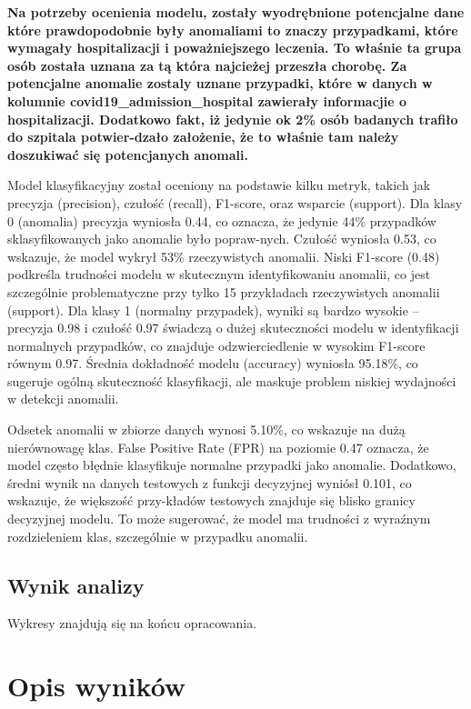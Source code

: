\documentclass[a4paper,fleqn]{cas-dc}
\begin{document}
\textbf{Na potrzeby ocenienia modelu, zostały wyodrębnione potencjalne dane które prawdopodobnie były anomaliami to znaczy przypadkami, które wymagały hospitalizacji i poważniejszego leczenia. To właśnie ta grupa osób została uznana za tą która najcieżej przeszła chorobę. Za potencjalne anomalie zostaly uznane przypadki, które w danych w kolumnie covid19\_admission\_hospital zawierały informacjie o  hospitalizacji. Dodatkowo fakt, iż jedynie ok 2\% osób badanych trafiło do szpitala potwier-dzało założenie, że to właśnie tam należy doszukiwać się potencjanych anomali.}  

Model klasyfikacyjny został oceniony na podstawie kilku metryk, takich jak precyzja (precision), czułość (recall), F1-score, oraz wsparcie (support). Dla klasy 0 (anomalia) precyzja wyniosła 0.44, co oznacza, że jedynie 44\% przypadków sklasyfikowanych jako anomalie było popraw-nych. Czułość wyniosła 0.53, co wskazuje, że model wykrył 53\% rzeczywistych anomalii. Niski F1-score (0.48) podkreśla trudności modelu w skutecznym identyfikowaniu anomalii, co jest szczególnie problematyczne przy tylko 15 przykładach rzeczywistych anomalii (support). Dla klasy 1 (normalny przypadek), wyniki są bardzo wysokie – precyzja 0.98 i czułość 0.97 świadczą o dużej skuteczności modelu w identyfikacji normalnych przypadków, co znajduje odzwierciedlenie w wysokim F1-score równym 0.97. Średnia dokładność modelu (accuracy) wyniosła 95.18\%, co sugeruje ogólną skuteczność klasyfikacji, ale maskuje problem niskiej wydajności w detekcji anomalii.

Odsetek anomalii w zbiorze danych wynosi 5.10\%, co wskazuje na dużą nierównowagę klas. False Positive Rate (FPR) na poziomie 0.47 oznacza, że model często błędnie klasyfikuje normalne przypadki jako anomalie. Dodatkowo, średni wynik na danych testowych z funkcji decyzyjnej wyniósł 0.101, co wskazuje, że większość przy-kładów testowych znajduje się blisko granicy decyzyjnej modelu. To może sugerować, że model ma trudności z wyraźnym rozdzieleniem klas, szczególnie w przypadku anomalii.


\subsection{Wynik analizy}

 Wykresy znajdują się na końcu opracowania.


\section{Opis wyników}
\end{document}
